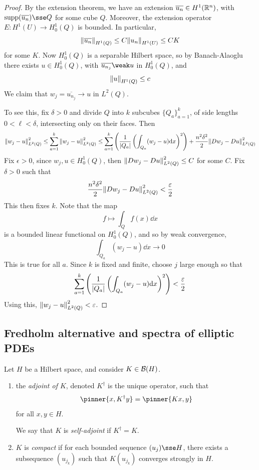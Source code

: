 \documentclass{article}
\begin{document}
\begin{proof}
    By the extension theorem, we have an extension \(\overline{u_n} \in H^1(\mathbb{R}^n)\), with \(\Supp(\overline{u_n}) \sse Q\) for some cube \(Q\). Moreover, the extension operator \(E : H^1(U) \to H_0^1(Q)\) is bounded. In particular,
    \[\norm{\overline{u_n}}_{H^1(Q)} \le C\norm{u_n}_{H^1(U)} \le CK\]
    for some \(K\). Now \(H_0^1(Q)\) is a separable Hilbert space, so by Banach-Alaoglu there exists \(u \in H_0^1(Q)\), with \(\overline{u_{n_j}} \weak u\) in \(H_0^1(Q)\), and
    \[\norm{u}_{H^1(Q)} \le c\]
    We claim that \(w_j = \overline{u_{n_j}} \to u\) in \(L^2(Q)\).

    To see this, fix \(\delta > 0\) and divide \(Q\) into \(k\) subcubes \(\{Q_a\}_{a=1}^k\), of side lengths \(0 < \ell < \delta\), intersecting only on their faces. Then
    \[\norm{w_j - u}^2_{L^2(Q)} \le \sum_{a=1}^k\norm{w_j - u}^2_{L^2(Q)} \le \sum_{a=1}^k \left(\frac{1}{\abs{Q_a}}\left(\int_{Q_a}(w_j - u)\dd x\right)^2\right) + \frac{n^2\delta^2}{2}\norm{D w_j - Du}^2_{L^2(Q)}\]
    Fix \(\epsilon > 0\), since \(w_j, u \in H_0^1(Q)\), then \(\norm{Dw_j - Du}^2_{L^2(Q)} \le C\) for some \(C\). Fix \(\delta > 0\) such that
    \[\frac{n^2\delta^2}{2}\norm{Dw_j - Du}_{L^2(Q)}^2 < \frac{\varepsilon}{2}\]
    This then fixes \(k\). Note that the map
    \[f \mapsto \int_Q f(x)\dd x\]
    is a bounded linear functional on \(H_0^1(Q)\), and so by weak convergence,
    \[\int_{Q_a}(w_j - u)\dd x \to 0\]
    This is true for all \(a\). Since \(k\) is fixed and finite, choose \(j\) large enough so that 
    \[\sum_{a=1}^k \left(\frac{1}{\abs{Q_a}}\left(\int_{Q_a}(w_j - u)\dd x\right)^2\right) < \frac{\varepsilon}{2}\]
    Using this, \(\norm{w_j - u}_{L^2(Q)}^2 < \varepsilon\).
\end{proof}

\lec

\subsection{Fredholm alternative and spectra of elliptic PDEs}

\begin{definition}
    Let \(H\) be a Hilbert space, and consider \(K \in \mathcal{B}(H)\).
    \begin{enumerate}
        \item the \emph{adjoint of \(K\)}, denoted \(K^\dagger\) is the unique operator, such that
        \[\pinner{x, K^\dagger y} = \pinner{Kx, y}\]
        for all \(x, y \in H\).
        
        We say that \(K\) is \emph{self-adjoint} if \(K^\dagger = K\).
        \item \(K\) is \emph{compact} if for each bounded sequence \((u_j) \sse H\), there exists a subsequence \((u_{j_k})\) such that \(K(u_{j_k})\) converges strongly in \(H\). 
    \end{enumerate}
\end{definition}
\end{document}
